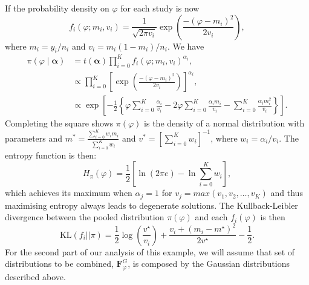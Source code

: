 \documentclass[12pt]{article}
\begin{document}
If the  probability density on $\varphi$ for each study is now
$$ f_i(\varphi; m_i, v_i) = \frac{1}{\sqrt{2\pi v_i}} \exp\left(\frac{-(\varphi-m_i)^2}{2v_i}\right), $$
where $m_i = y_i/n_i$ and $v_i = m_i(1-m_i)/n_i$.
We have
\begin{align}
\nonumber
\pi(\varphi \mid \boldsymbol\alpha)&= t(\boldsymbol\alpha)\prod_{i=0}^{K}f_i(\varphi; m_i, v_i)^{\alpha_i},\\
\nonumber
&\propto \prod_{i=0}^{K} \left[ \exp\left(\frac{-(\varphi-m_i)^2}{2v_i}\right) \right]^{\alpha_i},\\
&\propto \exp\left[-\frac{1}{2}\left\{\varphi\sum_{i=0}^K\frac{\alpha_i}{v_i} - 2\varphi\sum_{i=0}^K \frac{\alpha_im_i}{v_i} - \sum_{i=0}^K\frac{\alpha_im_i^2}{v_i} \right\}\right].
\end{align}
Completing the square shows $\pi(\varphi)$ is the density of a normal distribution with parameters and $m^* = \frac{\sum_{i=0}^K w_im_i}{\sum_{i=0}^K w_i}$ and $v^* = [\sum_{i=0}^K w_i]^{-1}$,  where $w_i = \alpha_i/v_i$.
The entropy function is then:
\begin{equation}
 \label{eq:normalpoolentropy}
 H_{\pi}(\varphi) = \frac{1}{2}\left[ \ln(2\pi e) - \ln\sum_{i=0}^K w_i\right],
\end{equation}
which achieves its maximum when $\alpha_j = 1$ for $v_j = max(v_1, v_2, \ldots, v_K)$ and thus maximising entropy always leads to degenerate solutions.
The Kullback-Leibler divergence between the pooled distribution $\pi(\varphi)$ and each $f_i(\varphi)$ is then
\begin{equation}
 \label{eq:KL_Gaussian}
  \text{KL}( f_i || \pi) = \frac{1}{2}\log\left(\frac{v^\star}{v_i}\right) + \frac{v_i + (m_i-m^\star)^2}{2v^\star} - \frac{1}{2}.
\end{equation}
For the second part of our analysis of this example, we will assume that set of distributions to be combined, $\boldsymbol F^{G}_\varphi$, is composed by the Gaussian distributions described above.
\end{document}
